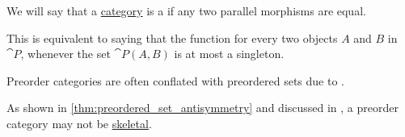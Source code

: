 \begin{definition}\label{def:preorder_category}
  We will say that a \hyperref[def:category]{category} is a  if any two parallel morphisms are equal.

  This is equivalent to saying that the function for every two objects \( A \) and \( B \) in \( \cat{P} \), whenever the set \( \cat{P}(A, B) \) is at most a singleton.
\end{definition}
\begin{comments}
  \item Preorder categories are often conflated with preordered sets due to .

  \item As shown in \cref{thm:preordered_set_antisymmetry} and discussed in , a preorder category may not be \hyperref[def:skeletal_category]{skeletal}.
\end{comments}

